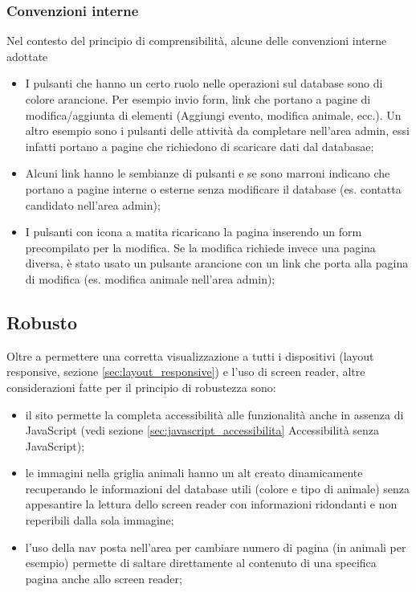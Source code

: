 \subsubsection{Convenzioni interne}
Nel contesto del principio di comprensibilità, alcune delle convenzioni interne adottate
\begin{itemize}
    \item I pulsanti che hanno un certo ruolo nelle operazioni sul database sono di colore arancione. Per esempio invio form, link che portano a pagine di modifica/aggiunta di elementi (Aggiungi evento, modifica animale, ecc.). Un altro esempio sono i pulsanti delle attività da completare nell'area admin, essi infatti portano a pagine che richiedono di scaricare dati dal databasae;
    \item Alcuni link hanno le sembianze di pulsanti e se sono marroni indicano che portano a pagine interne o esterne senza modificare il database (es. contatta candidato nell'area admin);
    \item I pulsanti con icona a matita ricaricano la pagina inserendo un form precompilato per la modifica. Se la modifica richiede invece una pagina diversa, è stato usato un pulsante arancione con un link che porta alla pagina di modifica (es. modifica animale nell'area admin);
\end{itemize}

\subsection{Robusto}
Oltre a permettere una corretta visualizzazione a tutti i dispositivi (layout responsive, sezione \ref{sec:layout_responsive}) e l'uso di screen reader, altre considerazioni fatte per il principio di robustezza sono:
\begin{itemize}
    \item il sito permette la completa accessibilità alle funzionalità anche in assenza di JavaScript (vedi sezione \ref{sec:javascript_accessibilita}{ Accessibilità senza JavaScript});
    \item le immagini nella griglia animali hanno un alt creato dinamicamente recuperando le informazioni del database utili (colore e tipo di animale) senza appesantire la lettura dello screen reader con informazioni ridondanti e non reperibili dalla sola immagine;
    \item l'uso della nav posta nell'area per cambiare numero di pagina (in animali per esempio) permette di saltare direttamente al contenuto di una specifica pagina anche allo screen reader;
\end{itemize}
